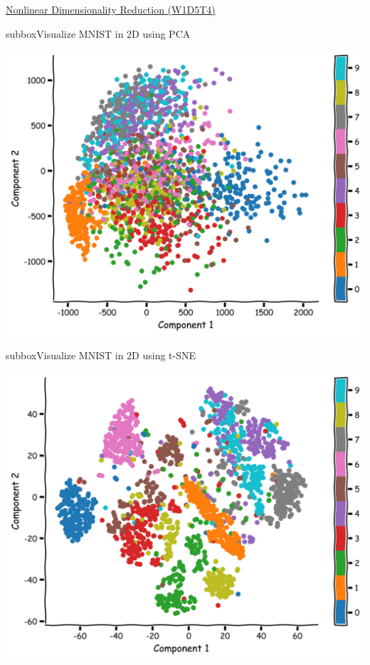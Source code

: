 \begin{textbox}{\href{https://compneuro.neuromatch.io/tutorials/W1D5_DimensionalityReduction/student/W1D5_Tutorial4.html}{ Nonlinear Dimensionality Reduction (W1D5T4)} }
\begin{subbox}{subbox}{Visualize MNIST in 2D using PCA}
\scriptsize

\centering
\includegraphics[scale=0.15]{Figures/DM/DMFigure5.png}

\end{subbox}
\begin{subbox}{subbox}{Visualize MNIST in 2D using t-SNE}
\scriptsize

\centering
\includegraphics[scale=0.15]{Figures/DM/DMFigure6.png}


\end{subbox}
\end{textbox}
